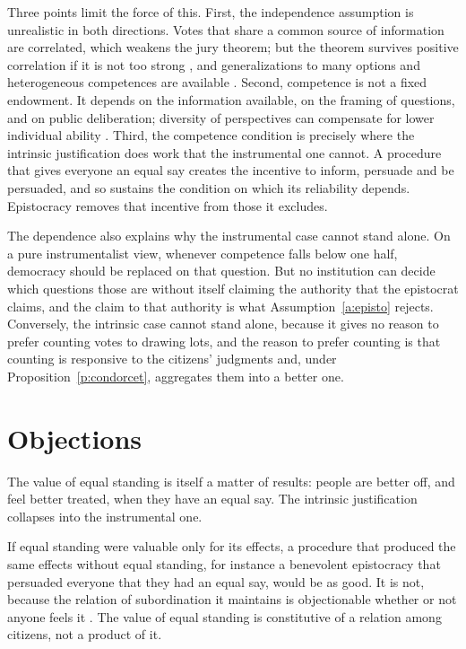 \documentclass{situationist-preprint}
\begin{document}
Three points limit the force of this. First, the independence assumption is unrealistic in both directions. Votes that share a common source of information are correlated, which weakens the jury theorem; but the theorem survives positive correlation if it is not too strong \citep{Ladha1992}, and generalizations to many options and heterogeneous competences are available \citep{ListGoodin2001}. Second, competence is not a fixed endowment. It depends on the information available, on the framing of questions, and on public deliberation; diversity of perspectives can compensate for lower individual ability \citep{Landemore2013}. Third, the competence condition is precisely where the intrinsic justification does work that the instrumental one cannot. A procedure that gives everyone an equal say creates the incentive to inform, persuade and be persuaded, and so sustains the condition on which its reliability depends. Epistocracy removes that incentive from those it excludes.

The dependence also explains why the instrumental case cannot stand alone. On a pure instrumentalist view, whenever competence falls below one half, democracy should be replaced on that question. But no institution can decide which questions those are without itself claiming the authority that the epistocrat claims, and the claim to that authority is what Assumption~\ref{a:episto} rejects. Conversely, the intrinsic case cannot stand alone, because it gives no reason to prefer counting votes to drawing lots, and the reason to prefer counting is that counting is responsive to the citizens' judgments and, under Proposition~\ref{p:condorcet}, aggregates them into a better one.

\section{Objections}

\begin{objection}
The value of equal standing is itself a matter of results: people are better off, and feel better treated, when they have an equal say. The intrinsic justification collapses into the instrumental one.
\end{objection}

\begin{reply}
If equal standing were valuable only for its effects, a procedure that produced the same effects without equal standing, for instance a benevolent epistocracy that persuaded everyone that they had an equal say, would be as good. It is not, because the relation of subordination it maintains is objectionable whether or not anyone feels it \citep{Kolodny2014b}. The value of equal standing is constitutive of a relation among citizens, not a product of it.
\end{reply}
\end{document}
